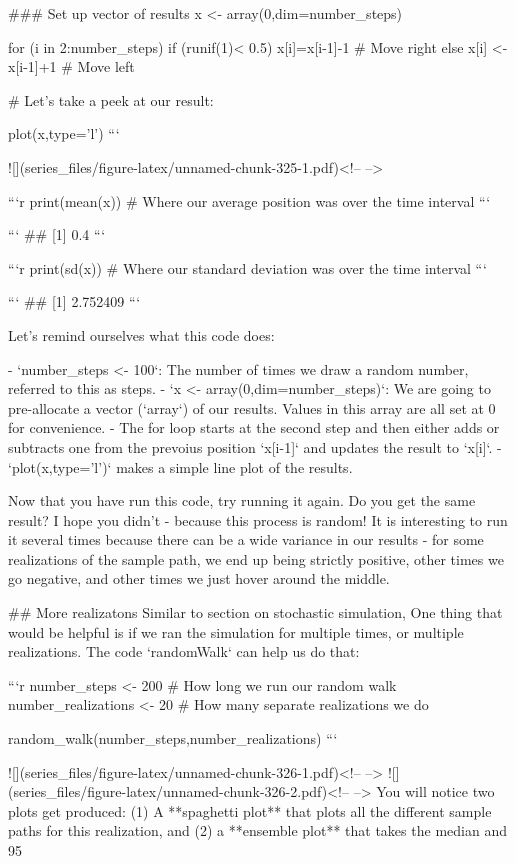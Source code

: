 \documentclass[
]{book}
\theoremstyle{definition}
\theoremstyle{definition}
\theoremstyle{definition}
\theoremstyle{remark}
\begin{document}
### Set up vector of results
x <- array(0,dim=number_steps)

for (i in 2:number_steps) {
  if (runif(1)< 0.5) {x[i]=x[i-1]-1}   # Move right
    else {x[i] <- x[i-1]+1}   # Move left
  }

# Let's take a peek at our result:

plot(x,type='l')
```

![](series_files/figure-latex/unnamed-chunk-325-1.pdf)<!-- --> 

```r
print(mean(x))  # Where our average position was over the time interval
```

```
## [1] 0.4
```

```r
print(sd(x))  # Where our standard deviation was over the time interval
```

```
## [1] 2.752409
```


Let's remind ourselves what this code does:

- `number_steps <- 100`: The number of times we draw a random number, referred to this as steps.
- `x <- array(0,dim=number_steps)`: We are going to pre-allocate a vector (`array`) of our results.  Values in this array are all set at 0 for convenience.
- The for loop starts at the second step and then either adds or subtracts one from the prevoius position `x[i-1]` and updates the result to `x[i]`.
- `plot(x,type='l')` makes a simple line plot of the results.

Now that you have run this code, try running it again. Do you get the same result?  I hope you didn't - because this process is random!  It is interesting to run it several times because there can be a wide variance in our results - for some realizations of the sample path, we end up being strictly positive, other times we go negative, and other times we just hover around the middle.

## More realizatons
Similar to section on stochastic simulation, One thing that would be helpful is if we ran the simulation for multiple times, or multiple realizations.  The code `randomWalk` can help us do that:


```r
number_steps <- 200  # How long we run our random walk
number_realizations <- 20 # How many separate realizations we do

random_walk(number_steps,number_realizations)
```

![](series_files/figure-latex/unnamed-chunk-326-1.pdf)<!-- --> ![](series_files/figure-latex/unnamed-chunk-326-2.pdf)<!-- --> 
You will notice two plots get produced: (1) A **spaghetti plot** that plots all the different sample paths for this realization, and (2) a **ensemble plot** that takes the median and 95%
\end{document}

